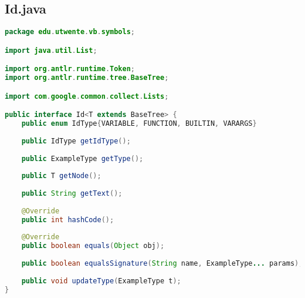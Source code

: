 \subsection{Id.java}
\begin{lstlisting}[language=Java]
package edu.utwente.vb.symbols;

import java.util.List;

import org.antlr.runtime.Token;
import org.antlr.runtime.tree.BaseTree;

import com.google.common.collect.Lists;

public interface Id<T extends BaseTree> {
	public enum IdType{VARIABLE, FUNCTION, BUILTIN, VARARGS}
	
	public IdType getIdType();
	
	public ExampleType getType();
	
	public T getNode();
	
	public String getText();
	
	@Override
	public int hashCode();
	
	@Override
	public boolean equals(Object obj);
	
	public boolean equalsSignature(String name, ExampleType... params);
	
	public void updateType(ExampleType t);
}

\end{lstlisting}
